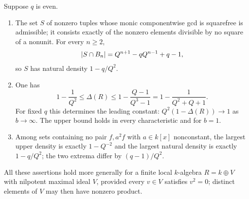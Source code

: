 \begin{theorem}\label{gpp:thm:char2}
Suppose $q$ is even.
\begin{enumerate}[label=\textup{(\roman*)}]
\item The set $S$ of nonzero tuples whose monic componentwise gcd is squarefree is
admissible; it consists exactly of the nonzero elements divisible by no square of a
nonunit. For every $n\ge2$,
\[
 \lvert S\cap B_n\rvert=Q^{n+1}-qQ^{n-1}+q-1,
\]
so $S$ has natural density $1-q/Q^2$.
\item One has
\begin{equation}\label{gpp:eq:localring}
 1-\frac1{Q^2}\le\Delta(R)\le1-\frac{Q-1}{Q^3-1}=1-\frac1{Q^2+Q+1}.
\end{equation}
For fixed $q$ this determines the leading constant: $Q^2(1-\Delta(R))\to1$ as
$b\to\infty$. The upper bound holds in every characteristic and for $b=1$.
\item Among sets containing no pair $f,a^2f$ with $a\in k[x]$ nonconstant, the largest
upper density is exactly $1-Q^{-2}$ and the largest natural density is exactly
$1-q/Q^2$; the two extrema differ by $(q-1)/Q^2$.
\end{enumerate}
All these assertions hold more generally for a finite local $k$-algebra $R=k\oplus V$
with nilpotent maximal ideal $V$, provided every $v\in V$ satisfies $v^2=0$; distinct
elements of $V$ may then have nonzero product.
\end{theorem}

